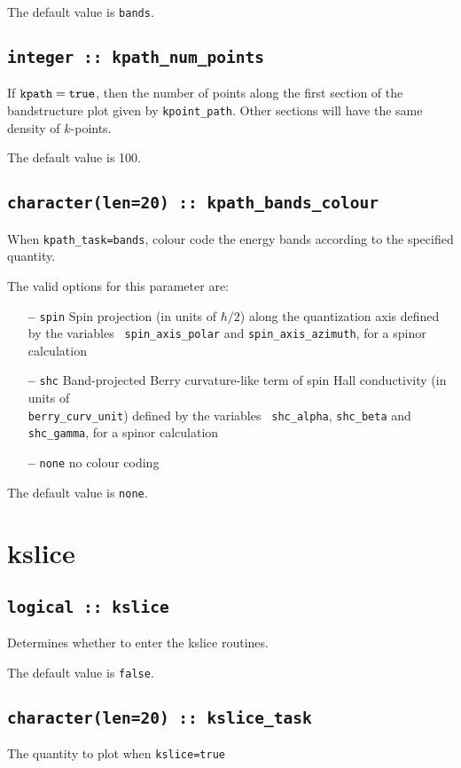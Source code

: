 The default value is {\tt bands}.


\subsection[kpath\_num\_points]{\tt integer :: kpath\_num\_points}

If $\verb#kpath#=\verb#true#$, then the number of points along
the first section of the bandstructure plot given by
\verb#kpoint_path#. Other sections will have the same density of
$k$-points. 

The default value is 100.


\subsection[kpath\_colour]{\tt character(len=20) ::
  kpath\_bands\_colour}
When {\tt kpath\_task=bands}, colour code the energy bands according
to the specified quantity.

The valid options for this parameter are:
\begin{itemize}
\item[{\bf --}] \verb#spin# Spin projection (in units of $\hbar/2$)
  along the quantization axis defined by the variables {\tt
    spin\_axis\_polar} and {\tt spin\_axis\_azimuth}, for a spinor
  calculation
\item[{\bf --}] \verb#shc# Band-projected Berry curvature-like term of spin Hall conductivity (in units of \\{\tt berry\_curv\_unit})
 defined by the variables {\tt
	shc\_alpha}, {\tt shc\_beta} and {\tt shc\_gamma}, for a spinor
calculation
\item[{\bf --}]  \verb#none# no colour coding
\end{itemize}

The default value is {\tt none}.


\clearpage
\section{kslice}

\subsection[berry]{\tt logical :: kslice}
Determines whether to enter the kslice routines.

The default value is \verb#false#.

\subsection[kslice\_task]{\tt character(len=20) ::  kslice\_task}
The quantity to plot when {\tt kslice=true} 

